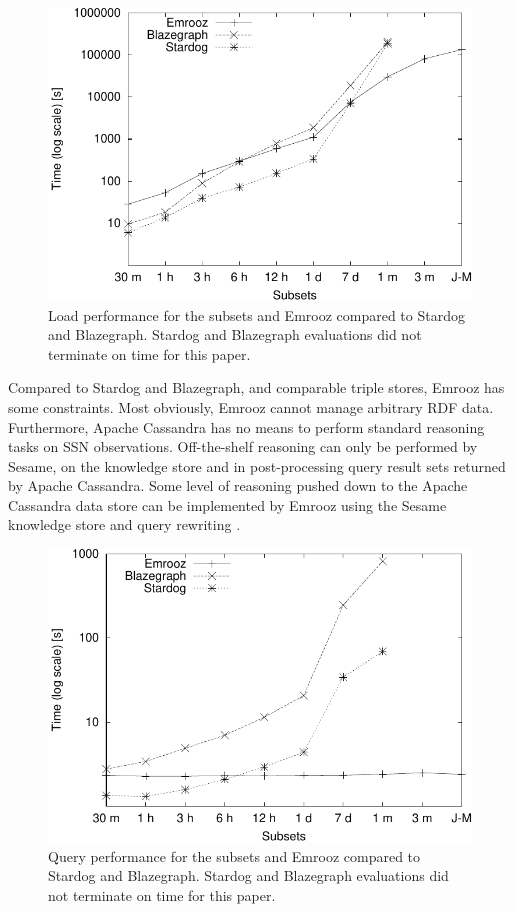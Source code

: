\documentclass[preprint,12pt,authoryear]{elsarticle}
\begin{document}
\begin{figure}
	\centering
	\includegraphics[scale=0.6]{load-performance-plot.pdf}
	\caption{Load performance for the subsets and Emrooz compared to Stardog and Blazegraph. Stardog and Blazegraph evaluations did not terminate on time for this paper.}
	\label{fig:load-performance-plot}
\end{figure}

Compared to Stardog and Blazegraph, and comparable triple stores, Emrooz has some constraints. Most obviously, Emrooz cannot manage arbitrary RDF data. Furthermore, Apache Cassandra has no means to perform standard reasoning tasks on SSN observations. Off-the-shelf reasoning can only be performed by Sesame, on the knowledge store and in post-processing query result sets returned by Apache Cassandra. Some level of reasoning pushed down to the Apache Cassandra data store can be implemented by Emrooz using the Sesame knowledge store and query rewriting \cite{kontchakov14rewriting}.

\begin{figure}
	\centering
	\includegraphics[scale=0.6]{query-performance-plot.pdf}
	\caption{Query performance for the subsets and Emrooz compared to Stardog and Blazegraph. Stardog and Blazegraph evaluations did not terminate on time for this paper.}
	\label{fig:query-performance-plot}
\end{figure}
\end{document}
